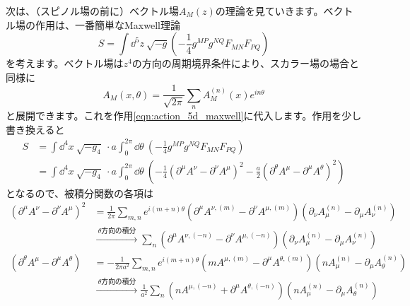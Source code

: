 \documentclass[unicode,a4paper,10pt]{ltjsarticle}
\begin{document}
次は、（スピノル場の前に）ベクトル場$A_{M}(z)$の理論を見ていきます。ベクトル場の作用は、一番簡単なMaxwell理論
\begin{equation}
   S
   =
   \int\dd^5 z\ 
   \sqrt{-g}
   \left(  
      -\frac{1}{4}g^{MP}g^{NQ}F_{MN}F_{PQ}
   \right)
   \label{eqn:action_5d_maxwell}
\end{equation}
を考えます。ベクトル場は$z^{4}$の方向の周期境界条件により、スカラー場の場合と同様に
\begin{equation}
   A_{M}(x,\theta)
   =
   \frac{1}{\sqrt{2\pi}}
   \sum_{n}A_{M}^{(n)}(x)e^{in\theta}
\end{equation}
と展開できます。これを作用\eqref{eqn:action_5d_maxwell}に代入します。作用を少し書き換えると
\begin{align}
   S
   &=
   \int\dd^4 x\ \sqrt{-g_{4}}\ 
   \cdot
   a\int_{0}^{2\pi}\dd\theta\ 
   \left( -\frac{1}{4}g^{MP}g^{NQ}F_{MN}F_{PQ} \right)
   \nonumber
   \\
   &=
   \int\dd^4 x\ \sqrt{-g_{4}}\ 
   \cdot
   a\int_{0}^{2\pi}\dd\theta\ 
   \left(  
      -\frac{1}{4}(\partial^{\mu}A^{\nu}-\partial^{\nu}A^{\mu})^2
      -\frac{a}{2}(\partial^{\theta}A^{\mu}-\partial^{\mu}A^{\theta})^2
   \right)   
   \label{eqn:2_2}
\end{align}
となるので、被積分関数の各項は
\begin{align}
   (\partial^{\mu}A^{\nu}-\partial^{\nu}A^{\mu})^2
   &=
   \frac{1}{2\pi}
   \sum_{m,n}e^{i(m+n)\theta}
   \left(  
      \partial^{\mu}A^{\nu,(m)}
      -
      \partial^{\nu}A^{\mu,(m)}
   \right)
   \left(  
      \partial_{\nu}A_{\mu}^{(n)}
      -
      \partial_{\mu}A_{\nu}^{(n)}
   \right)
   \nonumber
   \\
   &\xrightarrow{\ \text{$\theta$方向の積分}\ }
   \sum_{n}
   \left(  
      \partial^{\mu}A^{\nu,(-n)}
      -
      \partial^{\nu}A^{\mu,(-n)}
   \right)
   \left(  
      \partial_{\nu}A_{\mu}^{(n)}
      -
      \partial_{\mu}A_{\nu}^{(n)}
   \right)   
   \\
   (\partial^{\theta}A^{\mu}-\partial^{\mu}A^{\theta})
   &=
   -
   \frac{1}{2\pi a^2}
   \sum_{m,n}e^{i(m+n)\theta}
   \left(  
      mA^{\mu,(m)}-\partial^{\mu}A^{\theta,(m)}
   \right)
   \left(  
      nA_{\mu}^{(n)}-\partial_{\mu}A_{\theta}^{(n)}
   \right)
   \nonumber
   \\
   &\xrightarrow{\ \text{$\theta$方向の積分}\ }
   \frac{1}{a^2}
   \sum_{n}
   \left(  
      nA^{\mu,(-n)}+\partial^{\mu}A^{\theta,(-n)}
   \right)
   \left(  
      nA_{\mu}^{(n)}-\partial_{\mu}A_{\theta}^{(n)}
   \right)
\end{align}
\end{document}
